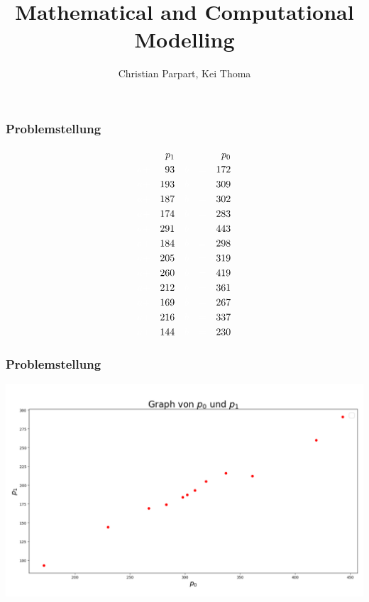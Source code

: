 \documentclass{beamer}
\title{Mathematical and Computational Modelling}
\author{Christian Parpart, Kei Thoma}
\date{} %
\begin{document}
\begin{frame}
    \frametitle{Problemstellung}
    \small
    \begin{alignat*}{5}
           && p_1 &&     && && p_0 \\
        {\color{white}a +}&& 93  &&   {\color{white}b} &&{\color{white}=}&& 172 \\
        {\color{white}a +}&& 193 &&   {\color{white}b} &&{\color{white}=}&& 309 \\
        {\color{white}a +}&& 187 &&   {\color{white}b} &&{\color{white}=}&& 302 \\
        {\color{white}a +}&& 174 &&   {\color{white}b} &&{\color{white}=}&& 283 \\
        {\color{white}a +}&& 291 &&   {\color{white}b} &&{\color{white}=}&& 443 \\
        {\color{white}a +}&& 184 &&   {\color{white}b} &&{\color{white}=}&& 298 \\
        {\color{white}a +}&& 205 &&   {\color{white}b} &&{\color{white}=}&& 319 \\
        {\color{white}a +}&& 260 &&   {\color{white}b} &&{\color{white}=}&& 419 \\
        {\color{white}a +}&& 212 &&   {\color{white}b} &&{\color{white}=}&& 361 \\
        {\color{white}a +}&& 169 &&   {\color{white}b} &&{\color{white}=}&& 267 \\
        {\color{white}a +}&& 216 &&   {\color{white}b} &&{\color{white}=}&& 337 \\
        {\color{white}a +}&& 144 &&   {\color{white}b} &&{\color{white}=}&& 230
    \end{alignat*}
\end{frame}

\begin{frame}
    \centering
    \frametitle{Problemstellung}
    \includegraphics[width=\textwidth]{scatter.png}
\end{frame}
\end{document}
